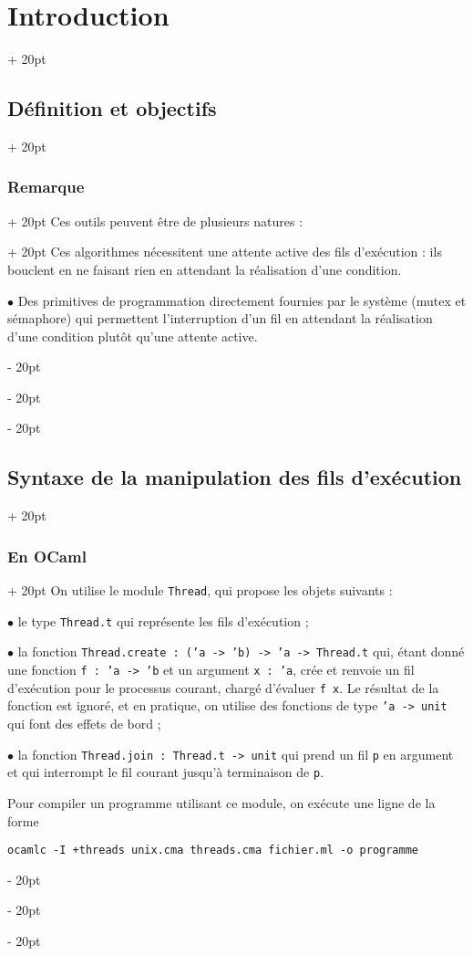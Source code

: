 \documentclass[a4paper, 12pt, twoside]{article}
\newcommand{\ind}[1][20pt]{\advance\leftskip + #1}
\newcommand{\deind}[1][20pt]{\advance\leftskip - #1}
\newenvironment{indt}[2][20pt]{#2 \par \ind[#1]}{\par \deind} %
\begin{document}
\begin{indt}{\section{Introduction}}
\begin{indt}{\subsection{Définition et objectifs}}
\begin{indt}{\subsubsection{Remarque}}
\begin{indt}{Ces outils peuvent être de plusieurs natures :}
                    Ces algorithmes nécessitent une attente active des fils d'exécution : ils bouclent en ne faisant rien en attendant la réalisation d'une condition.

                    $\bullet$ Des primitives de programmation directement fournies par le système (mutex et sémaphore) qui permettent l'interruption d'un fil en attendant la réalisation d'une condition plutôt qu'une attente active.
                \end{indt}
            \end{indt}
        \end{indt}

        \vspace{12pt}
        
        \begin{indt}{\subsection{Syntaxe de la manipulation des fils d'exécution}}
            \begin{indt}{\subsubsection{En OCaml}}
                On utilise le module \texttt{Thread}, qui propose les objets suivants :

                $\bullet$ le type \texttt{Thread.t} qui représente les fils d'exécution ;

                $\bullet$ la fonction \texttt{Thread.create : ('a -> 'b) -> 'a -> Thread.t} qui, étant donné une fonction \texttt{f : 'a -> 'b} et un argument \texttt{x : 'a}, crée et renvoie un fil d'exécution pour le processus courant, chargé d'évaluer \texttt{f x}.
                Le résultat de la fonction est ignoré, et en pratique, on utilise des fonctions de type \texttt{'a -> unit} qui font des effets de bord ;

                $\bullet$ la fonction \texttt{Thread.join : Thread.t -> unit} qui prend un fil \texttt p en argument et qui interrompt le fil courant jusqu'à terminaison de \texttt p.

                \vspace{12pt}
                
                Pour compiler un programme utilisant ce module, on exécute une ligne de la forme
                \begin{center}
                    \texttt{ocamlc -I +threads unix.cma threads.cma fichier.ml -o programme}
                \end{center}
            \end{indt}


\end{indt}
\end{indt}
\end{document}
